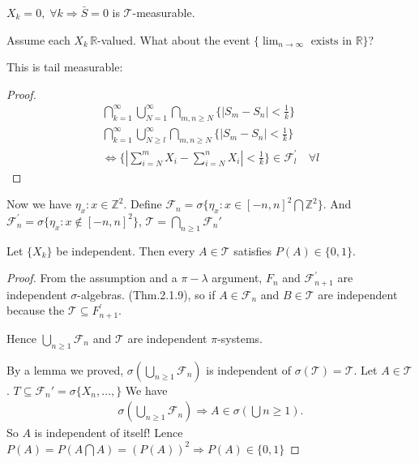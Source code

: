 \documentclass[11pt]{article}
\begin{document}
$X_k = 0, \; \forall k \Longrightarrow \bar{S} = 0$ is $\mathcal{T}$-measurable.

Assume each $X_k\,\mathbb{R}$-valued.
What about the event $\{ \lim_{n \to \infty} \text{ exists in }\mathbb{R} \}$?

This is tail measurable:
\begin{proof} 
    \begin{align*}
        \bigcap_{k=1}^{\infty} \bigcup_{N=1}^{\infty} \bigcap_{m,n \ge N}
    \{ |S_m - S_n| < \frac{1}{k} \}\\
    \bigcap_{k=1}^{\infty} \bigcup_{N\ge l}^{\infty} \bigcap_{m,n \ge N}
    \{ |S_m - S_n| < \frac{1}{k} \}\\
    \iff \{ |\sum_{i=N}^{m}X_{i} - \sum_{i=N}^{n}X_{i}| < \frac{1}{k} \} \in \mathcal{F}_{l}^{'} \quad \forall l
    \end{align*}
\end{proof}

Now we have $\eta_{x}: x \in \mathbb{Z}^{2}$. Define $\mathcal{F}_{n} = \sigma 
\{ \eta_{x}: x \in [-n,n]^{2} \bigcap \mathbb{Z}^{2} \}$. 
And $\mathcal{F}_{n}^{'} = \sigma \{ \eta_{x}: x \notin [-n,n]^{2} \}$, $\mathcal{T} = \bigcap_{n \ge 1}
\mathcal{F}_{n}'$

\begin{theorem}
    Let $\{ X_k \}$ be independent. Then every $A \in \mathcal{T}$ satisfies $P(A) \in \{ 0,1 \}$.
\end{theorem}
\begin{proof}
    From the assumption and a $\pi-\lambda$ argument, $F_{n}$ and $\mathcal{F}_{n+1}^{'}$ are 
    independent $\sigma$-algebras. (Thm.2.1.9), so if $A \in \mathcal{F}_{n}$ and $B \in \mathcal{T}$ 
    are independent because the $\mathcal{T} \subseteq F_{n+1}^{'}$. 

    Hence $\bigcup _{n \ge 1}\mathcal{F}_{n}$ and $\mathcal{T}$ are independent $\pi$-systems.

    By a lemma we proved, $\sigma(\bigcup_{n\ge 1}\mathcal{F}_n)$ is independent of $\sigma(\mathcal{T})
     = \mathcal{T}$. Let $ A \in \mathcal{T}$. $T \subseteq  \mathcal{F}_{n}' = \sigma\{ X_n, \ldots , \}$
     We have 
     \begin{align*}
        \sigma(\bigcup _{n \ge 1}\mathcal{F}_{n}) \Longrightarrow A \in \sigma(\bigcup n\ge 1).
     \end{align*}
     So $A$ is independent of itself! Lence $P(A) = P(A \bigcap A) = (P(A))^{2} 
     \Longrightarrow P(A) \in \{ 0,1 \}$
\end{proof}
\end{document}
